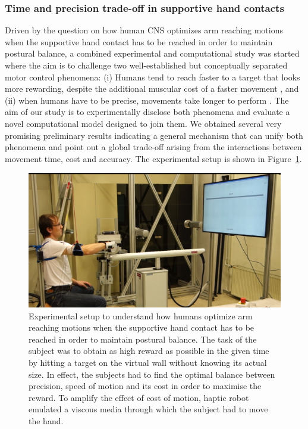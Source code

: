 \documentclass[final,5p,twocolumn]{elsarticle}
\begin{document}
\subsubsection{Time and precision trade-off in supportive hand contacts}
Driven by the question on how human CNS optimizes arm reaching motions when the supportive hand contact has to be reached in order to maintain postural balance, a combined experimental and computational study was started where the aim is to challenge two well-established but conceptually separated motor control phenomena: (i) Humans tend to reach faster to a target that looks more rewarding, despite the additional muscular cost of a faster movement \cite{Fitts1954}, and (ii) when humans have to be precise, movements take longer to perform \cite{Shadmehr2010}. The aim of our study is to experimentally disclose both phenomena and evaluate a novel computational model designed to join them. We obtained several very promising preliminary results indicating a general mechanism that can unify both phenomena and point out a global trade-off arising from the interactions between movement time, cost and accuracy. The experimental setup is shown in Figure~\ref{fig:UnifyingTwoPhenomena}.


\begin{figure}
\centering
\includegraphics[width=\linewidth]{images/UnifyingTwoPhenomena.png}
\caption{Experimental setup to understand how humans optimize arm reaching motions when the supportive hand contact has to be reached in order to maintain postural balance. The task of the subject was to obtain as high reward as possible in the given time by hitting a target on the virtual wall without knowing its actual size. In effect, the subjects had to find the optimal balance between precision, speed of motion and its cost in order to maximise the reward. To amplify the effect of cost of motion, haptic robot emulated a viscous media through which the subject had to move the hand.
}
\label{fig:UnifyingTwoPhenomena}
\end{figure}
\end{document}
